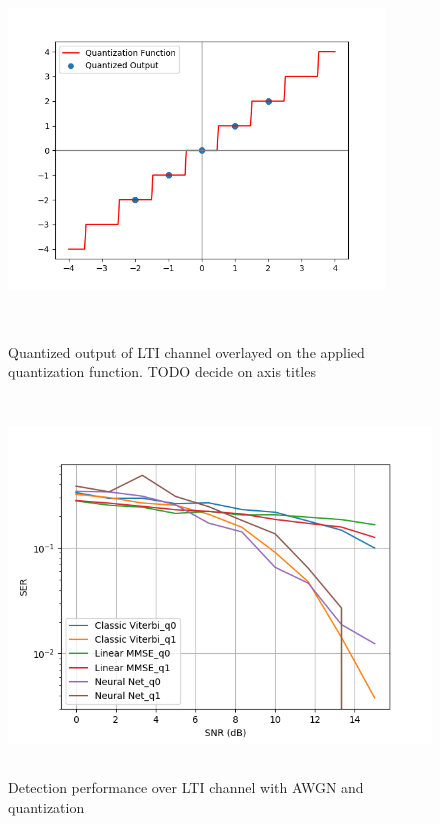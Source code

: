 \documentclass[12pt,a4paper]{article}
\begin{document}
\begin{figure}[H]
\centering
	\includegraphics[width=10cm,height = 10cm]{system_model/quantizer_overlay}
			  \caption{Quantized output of LTI channel overlayed on the applied quantization function. TODO decide on axis titles }
	  \label{fig:Quantized Overlay}
\end{figure}

\begin{figure}[H]
	\includegraphics[width=\textwidth,height = 10cm]{results/quantized_before_noise}
		  \caption{Detection performance over LTI channel with AWGN and quantization}
	  \label{fig:Quantized performance}
\end{figure}
\end{document}
